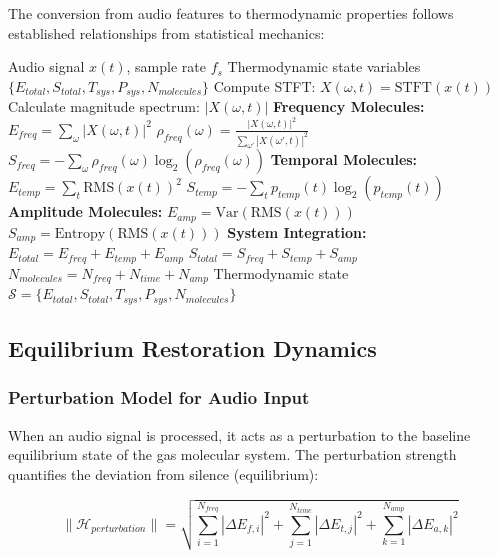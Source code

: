 \documentclass[12pt,a4paper]{article}
\begin{document}
The conversion from audio features to thermodynamic properties follows established relationships from statistical mechanics:

\begin{algorithm}[H]
\caption{Audio-to-Thermodynamic State Conversion}
\begin{algorithmic}[1]
\REQUIRE Audio signal $x(t)$, sample rate $f_s$
\ENSURE Thermodynamic state variables $\{E_{total}, S_{total}, T_{sys}, P_{sys}, N_{molecules}\}$
\STATE Compute STFT: $X(\omega, t) = \text{STFT}(x(t))$
\STATE Calculate magnitude spectrum: $|X(\omega, t)|$
\STATE \textbf{Frequency Molecules:}
\STATE $E_{freq} = \sum_{\omega} |X(\omega, t)|^2$ 
\STATE $\rho_{freq}(\omega) = \frac{|X(\omega, t)|^2}{\sum_{\omega'} |X(\omega', t)|^2}$ 
\STATE $S_{freq} = -\sum_{\omega} \rho_{freq}(\omega) \log_2(\rho_{freq}(\omega))$ 
\STATE \textbf{Temporal Molecules:}
\STATE $E_{temp} = \sum_{t} \text{RMS}(x(t))^2$ 
\STATE $S_{temp} = -\sum_{t} p_{temp}(t) \log_2(p_{temp}(t))$ 
\STATE \textbf{Amplitude Molecules:}
\STATE $E_{amp} = \text{Var}(\text{RMS}(x(t)))$ 
\STATE $S_{amp} = \text{Entropy}(\text{RMS}(x(t)))$ 
\STATE \textbf{System Integration:}
\STATE $E_{total} = E_{freq} + E_{temp} + E_{amp}$
\STATE $S_{total} = S_{freq} + S_{temp} + S_{amp}$
\STATE $N_{molecules} = N_{freq} + N_{time} + N_{amp}$
\RETURN Thermodynamic state $\mathcal{S} = \{E_{total}, S_{total}, T_{sys}, P_{sys}, N_{molecules}\}$
\end{algorithmic}
\end{algorithm}

\subsection{Equilibrium Restoration Dynamics}

\subsubsection{Perturbation Model for Audio Input}

When an audio signal is processed, it acts as a perturbation to the baseline equilibrium state of the gas molecular system. The perturbation strength quantifies the deviation from silence (equilibrium):

\begin{equation}
\|\mathcal{H}_{perturbation}\| = \sqrt{\sum_{i=1}^{N_{freq}} |\Delta E_{f,i}|^2 + \sum_{j=1}^{N_{time}} |\Delta E_{t,j}|^2 + \sum_{k=1}^{N_{amp}} |\Delta E_{a,k}|^2}
\end{equation}
\end{document}
